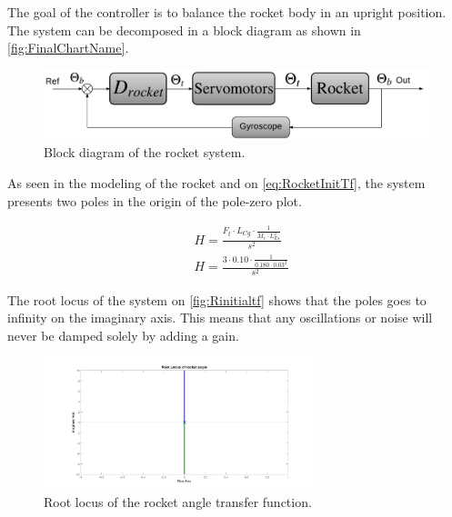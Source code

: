 \graphicspath{{figures/Rocket/design/}}

The goal of the controller is to balance the rocket body in an upright position. The system can be decomposed in a block diagram as shown in \autoref{fig:FinalChartName}.

\begin{figure}[htbp]
	\centering
	\includegraphics[width=\textwidth]{figures/Rocket/design/BlockRocket}
	\caption{Block diagram of the rocket system.}
	\label{fig:FinalChartName}
\end{figure}

As seen in the modeling of the rocket and on \autoref{eq:RocketInitTf}, the system presents two poles in the origin of the pole-zero plot. 

\begin{subequations}
	\begin{flalign}
		& H = \frac{F_t \cdot L_{Cg} \cdot \frac{1}{M_r \cdot L_{Es}^2}}{s^2}	\label{eq:RocketInitTf} \\
		& H = \frac{3 \cdot 0.10 \cdot \frac{1}{0.180 \cdot 0.03^2}}{s^2}
	\end{flalign}
\end{subequations}

The root locus of the system on \autoref{fig:Rinitialtf} shows that the poles goes to infinity on the imaginary axis. This means that any oscillations or noise will never be damped solely by adding a gain. 
\begin{figure}[htbp]
\centering
\includegraphics[width=0.7\textwidth]{figures/Rocket/design/initial_transfer_function_vf}
\caption{Root locus of the rocket angle transfer function.}
\label{fig:Rinitialtf}
\end{figure}

